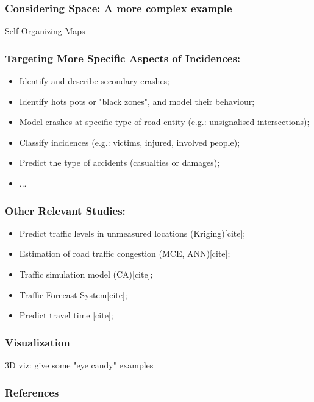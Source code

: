 \documentclass[hyperref={pdfpagelabels=true}]{beamer}
\begin{document}
\begin{frame}
\frametitle{Considering Space: A more complex example}
Self Organizing Maps

\end{frame}

\begin{frame}
\frametitle{Targeting More Specific Aspects of Incidences:}
\begin{itemize}
\item Identify and describe secondary crashes;
\item Identify hots pots or "black zones", and model their behaviour;
\item Model crashes at specific type of road entity (e.g.: unsignalised intersections);
\item Classify incidences (e.g.: victims, injured, involved people);
\item Predict the type of accidents (casualties or damages);
\item ...
\end{itemize}
\end{frame}

\begin{frame}
\frametitle{Other Relevant Studies:}
\begin{itemize}
\item Predict traffic levels in unmeasured locations (Kriging)[cite];
\item Estimation of road traffic congestion (MCE, ANN)[cite];
\item Traffic simulation model (CA)[cite];
\item Traffic Forecast System[cite];
\item Predict travel time [cite];
\end{itemize}
\end{frame}

\begin{frame}
\frametitle{Visualization}
3D viz: give some "eye candy" examples
\end{frame}

\begin{frame}
\frametitle{References}
\end{frame}
\end{document}
